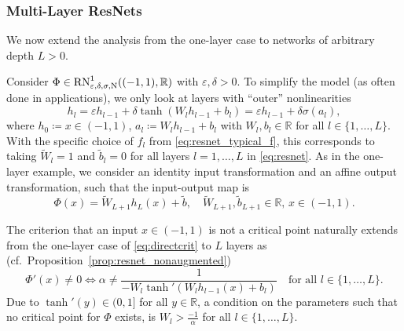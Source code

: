 \documentclass[10pt]{article}
\theoremstyle{definition}
\numberwithin{equation}{section}
\newcommand{\eps}{\varepsilon}
\newcommand{\R}{\mathbb{R}}
\begin{document}
  \subsubsection{Multi-Layer ResNets}
  We now extend the analysis from the one-layer case to networks of arbitrary depth $L > 0$.
 
 Consider $\Phi \in \textup{RN}^1_{\eps,\delta,\sigma,\textup{N}}((-1,1),\R)$ with $\eps,\delta > 0$.
    To simplify the model (as often done in applications), we only look at layers with ``outer'' nonlinearities
    \begin{equation} \label{eq:ResNetGeneral1D}
        h_{l} = \eps h_{l-1} + \delta \tanh(W_l h_{l-1} +b_l)   = \eps h_{l-1} + \delta \sigma(a_l),
    \end{equation}
    where $h_0\coloneqq x \in (-1,1)$, $a_l \coloneqq W_l h_{l-1} + b_l$ with  $W_l, b_l \in \R$ for all $l\in \{1,\ldots,L\}$. With the specific choice of $f_l$ from \eqref{eq:resnet_typical_f}, this corresponds to taking $\widetilde{W}_l = 1$ and $\tilde{b}_l = 0$ for all layers $l = 1, \ldots, L$ in \eqref{eq:resnet}. As in the one-layer example, we consider an identity input transformation and an affine output transformation, such that the input-output map is
    \begin{equation}\label{eq:inputtooutput}
        \Phi(x) = \widetilde{W}_{L+1} h_L(x) + \tilde{b}, \quad \widetilde{W}_{L+1},\tilde{b}_{L+1}  \in \R,\, x\in (-1,1).
    \end{equation}

The criterion that an input $x\in (-1,1)$ is not a critical point naturally extends from the one-layer case of \eqref{eq:directcrit} to $L$ layers as (cf.\ Proposition~\ref{prop:resnet_nonaugmented})
        \begin{equation}\label{eq:directcritmulti}
    \Phi'(x) \neq 0 \iff \alpha \neq \frac{1}{- W_l \tanh'(W_l h_{l-1}(x) + b_l)} \quad \text{for all } l\in \{1,\ldots, L\}.
    \end{equation}
Due to $\tanh'(y)\in (0,1]$ for all $y\in\R$, a condition on the parameters such that no critical point for $\Phi$ exists, is $ W_l > \frac{-1}{\alpha}$ for all $l \in \{1, \ldots, L\}$. 
    
\end{document}
